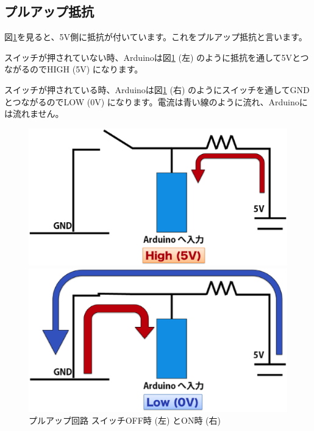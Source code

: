 \documentclass[11pt,a4paper]{jarticle}
\begin{document}
\subsection{プルアップ抵抗}
図\ref{fig:pullup}を見ると、5V側に抵抗が付いています。これをプルアップ抵抗と言います。
 
スイッチが押されていない時、Arduinoは図\ref{fig:pullup} (左) のように抵抗を通して5VとつながるのでHIGH (5V) になります。

スイッチが押されている時、Arduinoは図\ref{fig:pullup} (右) のようにスイッチを通してGNDとつながるのでLOW (0V) になります。電流は青い線のように流れ、Arduinoには流れません。

\begin{figure}[htbp]
 \begin{minipage}{0.5\columnwidth}
  \centering
  \includegraphics[width=0.8\columnwidth]{img/pullup_off.eps}
 \end{minipage}
 \begin{minipage}{0.5\columnwidth}
  \includegraphics[width=0.8\columnwidth]{img/pullup_on.eps}
 \end{minipage}
 \caption{プルアップ回路 スイッチOFF時 (左) とON時 (右)  }
 \label{fig:pullup}
\end{figure}

\end{document}
